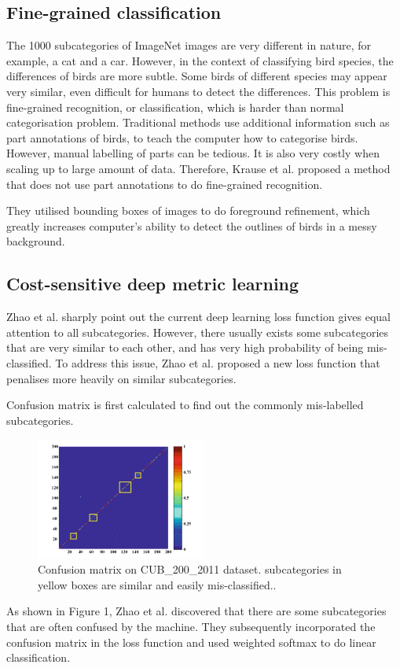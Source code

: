 \documentclass[letterpaper, 12pt]{article}
\begin{document}
\subsection{Fine-grained classification}
The 1000 subcategories of ImageNet images are very different in nature, for example, a cat and a car.
However, in the context of classifying bird species, the differences of birds are more subtle. Some
birds of different species may appear very similar, even difficult for humans to detect the differences.
This problem is fine-grained recognition, or classification, which is harder than normal categorisation problem.
Traditional methods use additional information such as part annotations of birds, to teach the computer how to
categorise birds. However, manual labelling of parts can be tedious. It is also very costly when scaling up to
large amount of data. Therefore, Krause et al. \cite{krause2015fine} proposed a method that does not use part annotations
to do fine-grained recognition.

They utilised bounding boxes of images to do foreground refinement, which greatly increases computer's ability
to detect the outlines of birds in a messy background.

\subsection{Cost-sensitive deep metric learning}
Zhao et al. \cite{Zhao} sharply point out the current deep learning loss function gives equal attention to all
subcategories. However, there usually exists some subcategories that are very similar to each other, and has very
high probability of being mis-classified. To address this issue, Zhao et al. \cite{Zhao} proposed a new loss function
that penalises more heavily on similar subcategories.

Confusion matrix is first calculated to find out the commonly mis-labelled subcategories.
\begin{figure}
    \begin{center}
        \includegraphics[width=0.5\textwidth]{confusion_matrix}
        \caption{Confusion matrix on CUB\_200\_2011 dataset. subcategories in yellow boxes are similar and easily mis-classified.\cite{Zhao}.}
    \end{center}
\end{figure}
As shown in Figure 1, Zhao et al. discovered that there are some subcategories that are often confused by the machine. They
subsequently incorporated the confusion matrix in the loss function and used weighted softmax to do linear classification.
\end{document}
